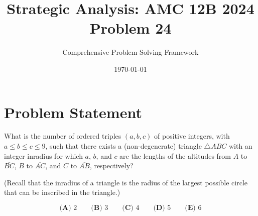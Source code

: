 \documentclass[12pt]{article}
\begin{document}
\title{\textbf{Strategic Analysis: AMC 12B 2024 Problem 24}}
\author{Comprehensive Problem-Solving Framework}
\date{\today}
\maketitle

\section*{Problem Statement}

What is the number of ordered triples $(a,b,c)$ of positive integers, with $a \leq b \leq c \leq 9$, such that there exists a (non-degenerate) triangle $\triangle ABC$ with an integer inradius for which $a$, $b$, and $c$ are the lengths of the altitudes from $A$ to $\overline{BC}$, $B$ to $\overline{AC}$, and $C$ to $\overline{AB}$, respectively?

(Recall that the inradius of a triangle is the radius of the largest possible circle that can be inscribed in the triangle.)

$$\textbf{(A) } 2 \qquad \textbf{(B) } 3 \qquad \textbf{(C) } 4 \qquad \textbf{(D) } 5 \qquad \textbf{(E) } 6$$

\vspace{1cm}
\end{document}
